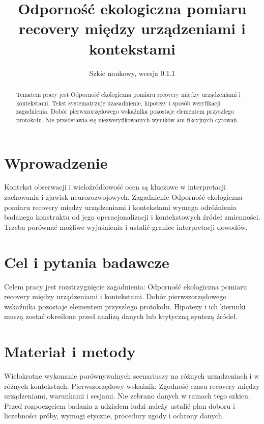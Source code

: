 \documentclass[11pt,a4paper]{article}
\title{Odporność ekologiczna pomiaru recovery między urządzeniami i kontekstami}
\author{}
\date{Szkic naukowy, wersja 0.1.1}
\begin{document}
\maketitle

\begin{abstract}

Tematem pracy jest Odporność ekologiczna pomiaru recovery między urządzeniami i kontekstami. Tekst systematyzuje uzasadnienie, hipotezy i sposób weryfikacji zagadnienia. Dobór pierwszorzędowego wskaźnika pozostaje elementem przyszłego protokołu. Nie przedstawia się niezweryfikowanych wyników ani fikcyjnych cytowań.

\end{abstract}

\section{Wprowadzenie}

Kontekst obserwacji i wieloźródłowość ocen są kluczowe w interpretacji zachowania i zjawisk neurorozwojowych. Zagadnienie Odporność ekologiczna pomiaru recovery między urządzeniami i kontekstami wymaga odróżnienia badanego konstruktu od jego operacjonalizacji i kontekstowych źródeł zmienności. Trzeba porównać możliwe wyjaśnienia i ustalić granice interpretacji dowodów.

\section{Cel i pytania badawcze}

Celem pracy jest rozstrzygnięcie zagadnienia: Odporność ekologiczna pomiaru recovery między urządzeniami i kontekstami. Dobór pierwszorzędowego wskaźnika pozostaje elementem przyszłego protokołu. Hipotezy i ich kierunki muszą zostać określone przed analizą danych lub krytyczną syntezą źródeł.

\section{Materiał i metody}

Wielokrotne wykonanie porównywalnych scenariuszy na różnych urządzeniach i w różnych kontekstach. Pierwszorzędowy wskaźnik: Zgodność czasu recovery między urządzeniami, warunkami i sesjami. Nie zebrano danych w ramach tego szkicu. Przed rozpoczęciem badania z udziałem ludzi należy ustalić plan doboru i liczebności próby, wymogi etyczne, procedury zgody i ochrony danych.
\end{document}
